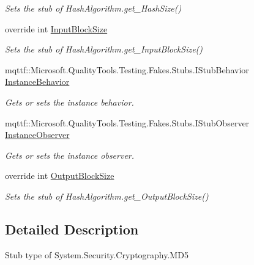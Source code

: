 \begin{DoxyCompactItemize}
\begin{DoxyCompactList}\small\item\em Sets the stub of Hash\-Algorithm.\-get\-\_\-\-Hash\-Size()\end{DoxyCompactList}\item 
override int \hyperlink{class_system_1_1_security_1_1_cryptography_1_1_fakes_1_1_stub_m_d5_ab2a7237af419f8a5b390575cec1c6bcd}{Input\-Block\-Size}
\begin{DoxyCompactList}\small\item\em Sets the stub of Hash\-Algorithm.\-get\-\_\-\-Input\-Block\-Size()\end{DoxyCompactList}\item 
mqttf\-::\-Microsoft.\-Quality\-Tools.\-Testing.\-Fakes.\-Stubs.\-I\-Stub\-Behavior \hyperlink{class_system_1_1_security_1_1_cryptography_1_1_fakes_1_1_stub_m_d5_a86ac8b6392a56ed55d9ec05ebeb0ea5a}{Instance\-Behavior}
\begin{DoxyCompactList}\small\item\em Gets or sets the instance behavior.\end{DoxyCompactList}\item 
mqttf\-::\-Microsoft.\-Quality\-Tools.\-Testing.\-Fakes.\-Stubs.\-I\-Stub\-Observer \hyperlink{class_system_1_1_security_1_1_cryptography_1_1_fakes_1_1_stub_m_d5_a934296dd9265c6975c9066a0f03ef996}{Instance\-Observer}
\begin{DoxyCompactList}\small\item\em Gets or sets the instance observer.\end{DoxyCompactList}\item 
override int \hyperlink{class_system_1_1_security_1_1_cryptography_1_1_fakes_1_1_stub_m_d5_a4cddce36def6487ba96a90e9b1c094e2}{Output\-Block\-Size}
\begin{DoxyCompactList}\small\item\em Sets the stub of Hash\-Algorithm.\-get\-\_\-\-Output\-Block\-Size()\end{DoxyCompactList}\end{DoxyCompactItemize}


\subsection{Detailed Description}
Stub type of System.\-Security.\-Cryptography.\-M\-D5



